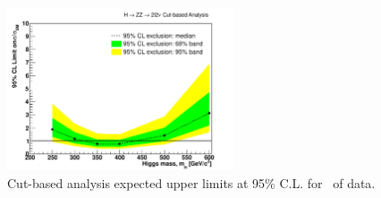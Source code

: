 \begin{figure}[!htbp]
\begin{center}
   \includegraphics[width=0.6\textwidth]{figures/limits_cut_4fb.pdf}
   \caption{Cut-based analysis expected upper limits at 95\% C.L. for \intlumi\ of data. }
   \label{fig:limits_cut_4fb}
\end{center}
\end{figure}


\clearpage
